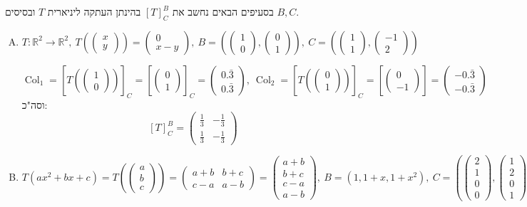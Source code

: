 \documentclass[]{article}
\newcommand\R     {\mathbb{R}}
\DeclareMathOperator\col   {Col}
\newcommand\co        {\colon}
\newcommand\pms[1]    {\begin{pmatrix}
		#1
\end{pmatrix}}
\newcommand\cl [1]    {\left ( #1 \right )}
\newcommand\csb[1]    {\left [ #1 \right ]}
\begin{document}
	\section{}
	בסעיפים הבאים נחשב את $[T]^B_C$ בהינתן העתקה ליניארית $T$ ובסיסים $B, C$. 
	\begin{enumerate}[A)]
		\item 
		\[ T \co \R^2 \to \R^2, \ T\cl{\pms{x \\ y}} = \pms{0 \\ x - y}, \ B = \cl{\pms{1 \\ 0}, \pms{0 \\ 1}}, \ C = \cl{\pms{1 \\ 1}, \pms{-1 \\ 2}} \]
		
		\[ \col_1 = \csb{T\cl{\pms{1 \\ 0}}}_C = \csb{\pms{0 \\ 1}}_C = \pms{0.\bar3 \\ 0.\bar 3}, \ \col_2 = \csb{T\cl{\pms{0 \\ 1}}}_C = \csb{\pms{0 \\ -1}} = \pms{-0.\bar 3 \\ -0.\bar3} \]
		וסה"כ: 
		\[ [T]^B_C = \pms{\frac{1}{3} & - \frac{1}{3} \\ \frac{1}{3} & -\frac{1}{3}} \]
		\item 
		\[ T(ax^2 + bx + c) = T\cl{\pms{a \\ b \\ c}} = \pms{a + b & b + c \\ c - a & a - b} = \pms{a + b \\ b + c \\ c - a \\ a - b}, \ B = (1, 1 + x, 1+ x^2), \ C = \cl{\pms{2 \\ 1 \\ 0 \\ 0}, \pms{1 \\ 2 \\ 0 \\ 1}, \pms{1 \\ 0 \\ 1 \\2}, \pms{1 \\ 0 \\ 0 \\ 0}} \]
		\begin{gather*}

\end{gather*}
\end{enumerate}
\end{document}
